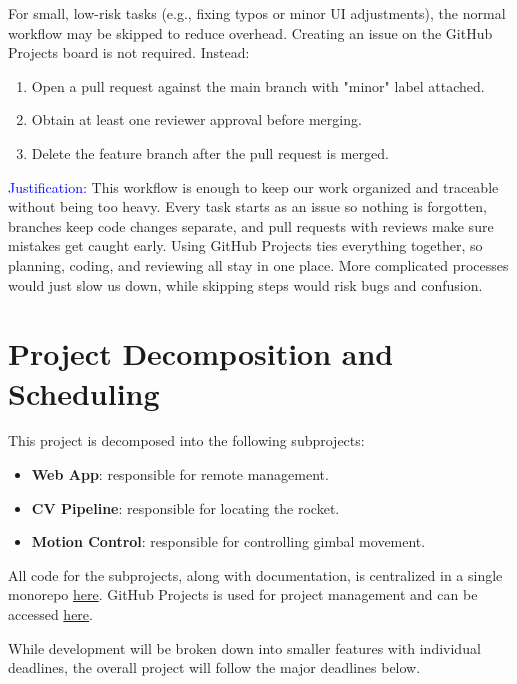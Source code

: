\documentclass{article}
\begin{document}
For small, low-risk tasks (e.g., fixing typos or minor UI adjustments), the
normal workflow may be skipped to reduce overhead. Creating an issue on the
GitHub Projects board is not required. Instead:
\begin{enumerate}
  \item Open a pull request against the main branch with "minor" label attached.
  \item Obtain at least one reviewer approval before merging.
  \item Delete the feature branch after the pull request is merged.
\end{enumerate}

\textcolor{blue}{Justification:} This workflow is enough to keep our work organized
and traceable without being too heavy. Every task starts as an issue so nothing
is forgotten, branches keep code changes separate, and pull requests with reviews
make sure mistakes get caught early. Using GitHub Projects ties everything together,
so planning, coding, and reviewing all stay in one place. More complicated processes
would just slow us down, while skipping steps would risk bugs and confusion.


\section{Project Decomposition and Scheduling}

This project is decomposed into the following subprojects:

\begin{itemize}
  \item \textbf{Web App}: responsible for remote management.
  \item \textbf{CV Pipeline}: responsible for locating the rocket.
  \item \textbf{Motion Control}: responsible for controlling gimbal movement.
\end{itemize}

All code for the subprojects, along with documentation, is centralized in a
single monorepo \href{https://github.com/ZifanSi/vision-guided-tracker}{here}.
GitHub Projects is used for project management and can be accessed
\href{https://github.com/users/ZifanSi/projects/1}{here}.

While development will be broken down into smaller features with individual
deadlines, the overall project will follow the major deadlines below.
\end{document}
